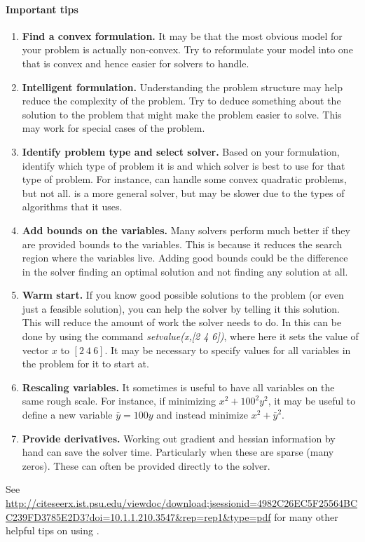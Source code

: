 \documentclass[../open-optimization/open-optimization.tex]{subfiles}
\begin{document}
\paragraph{Important tips}
\begin{enumerate}
\item \textbf{Find a convex formulation.}  It may be that the most obvious model for your problem is actually non-convex.  Try to reformulate your model into one that is convex and hence easier for solvers to handle.
\item \textbf{Intelligent formulation.}  Understanding the problem structure may help reduce the complexity of the problem.  Try to deduce something about the solution to the problem that might make the problem easier to solve.  This may work for special cases of the problem.
\item \textbf{Identify problem type and select solver.}  Based on your formulation, identify which type of problem it is and which solver is best to use for that type of problem.  For instance, \gurobi can handle some convex quadratic problems, but not all.  \ipopt is a more general solver, but may be slower due to the types of algorithms that it uses.

\item \textbf{Add bounds on the variables.} Many solvers perform much better if they are provided bounds to the variables.  This is because it reduces the search region where the variables live.   Adding good bounds could be the difference in the solver finding an optimal solution and not finding any solution at all.
\item \textbf{Warm start.} If you know good possible solutions to the problem (or even just a feasible solution), you can help the solver by telling it this solution.  This will reduce the amount of work the solver needs to do.  In \jump this can be done by using the command \textit{setvalue(x,[2 4 6])}, where here it sets the value of vector $x$ to $[2\ 4\ 6]$.  It may be necessary to specify values for all variables in the problem for it to start at.
\item \textbf{Rescaling variables.} It sometimes is useful to have all variables on the same rough scale.  For instance, if minimizing $x^2 + 100^2 y^2$, it may be useful to define a new variable $\bar y = 100y$ and instead minimize $x^2 + \bar y^2$.
\item \textbf{Provide derivatives.} Working out gradient and hessian information by hand can save the solver time.  Particularly when these are sparse (many zeros).  These can often be provided directly to the solver.
\end{enumerate}
See \url{http://citeseerx.ist.psu.edu/viewdoc/download;jsessionid=4982C26EC5F25564BCC239FD3785E2D3?doi=10.1.1.210.3547&rep=rep1&type=pdf} for many other helpful tips on using \ipopt.
\end{document}
